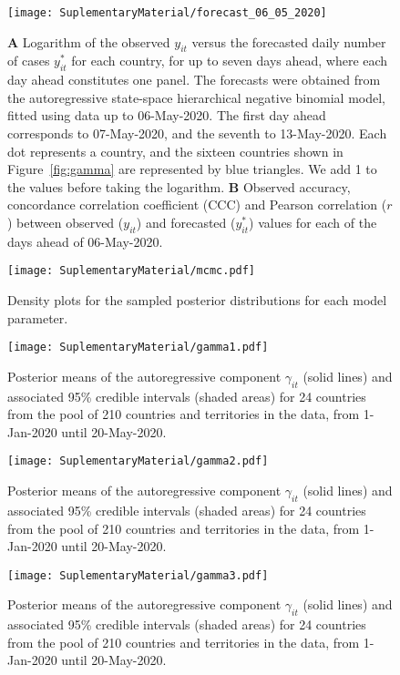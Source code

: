 \documentclass[fleqn,10pt]{wlscirep}
\begin{document}
\begin{figure}[ht!]
    \centering
    \texttt{[image: SuplementaryMaterial/forecast\_06\_05\_2020]}
    \caption{\textbf{A} Logarithm of the observed $y_{it}$ versus the forecasted daily number of cases $y^*_{it}$ for each country, for up to seven days ahead, where each day ahead constitutes one panel. The forecasts were obtained from the autoregressive state-space hierarchical negative binomial model, fitted using data up to 06-May-2020. The first day ahead corresponds to 07-May-2020, and the seventh to 13-May-2020. Each dot represents a country, and the sixteen countries shown in Figure~\ref{fig:gamma} are represented by blue triangles. We add 1 to the values before taking the logarithm. \textbf{B} Observed accuracy, concordance correlation coefficient (CCC) and Pearson correlation ($r$) between observed ($y_{it}$) and forecasted ($y^*_{it}$) values for each of the days ahead of 06-May-2020.}
    \label{fig:forecast2}
\end{figure}


\begin{figure}[ht!]
    \centering
    \texttt{[image: SuplementaryMaterial/mcmc.pdf]}
    \caption{Density plots for the sampled posterior distributions for each model parameter.}
    \label{fig:mcmc}
\end{figure}


\begin{figure}[ht!]
    \centering
    \texttt{[image: SuplementaryMaterial/gamma1.pdf]}
    \caption{Posterior means of the autoregressive component $\gamma_{it}$ (solid lines) and associated 95\% credible intervals (shaded areas) for 24 countries from the pool of 210 countries and territories in the data, from 1-Jan-2020 until 20-May-2020.}
    \label{fig:gamma_suppl1}
\end{figure}

\begin{figure}[ht!]
    \centering
    \texttt{[image: SuplementaryMaterial/gamma2.pdf]}
    \caption{Posterior means of the autoregressive component $\gamma_{it}$ (solid lines) and associated 95\% credible intervals (shaded areas) for 24 countries from the pool of 210 countries and territories in the data, from 1-Jan-2020 until 20-May-2020.}
\end{figure}

\begin{figure}[ht!]
    \centering
    \texttt{[image: SuplementaryMaterial/gamma3.pdf]}
    \caption{Posterior means of the autoregressive component $\gamma_{it}$ (solid lines) and associated 95\% credible intervals (shaded areas) for 24 countries from the pool of 210 countries and territories in the data, from 1-Jan-2020 until 20-May-2020.}
\end{figure}
\end{document}
